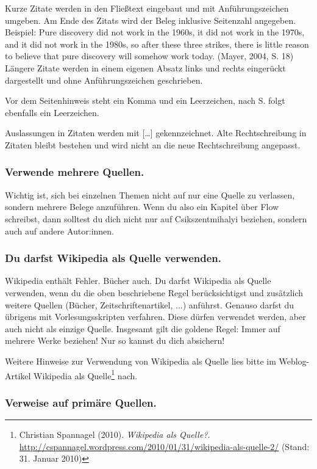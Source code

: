 \documentclass{../cssheet}
\begin{document}
Kurze Zitate werden in den Fließtext eingebaut und mit Anführungszeichen
umgeben. Am Ende des Zitats wird der Beleg inklusive Seitenzahl
angegeben. Beispiel: \glqq{}Pure discovery did not work in the 1960s, it did
not work in the 1970s, and it did not work in the 1980s, so after these
three strikes, there is little reason to believe that pure discovery
will somehow work today.\grqq{} (Mayer, 2004, S. 18) Längere Zitate werden in
einem eigenen Absatz links und rechts eingerückt dargestellt und ohne
Anführungszeichen geschrieben.

Vor dem Seitenhinweis steht ein Komma und ein Leerzeichen, nach \glqq{}S.\grqq{}
folgt ebenfalls ein Leerzeichen.

Auslassungen in Zitaten werden mit [\ldots] gekennzeichnet. Alte
Rechtschreibung in Zitaten bleibt bestehen und wird nicht an die neue
Rechtschreibung angepasst.

\subsubsection*{Verwende mehrere Quellen.}

Wichtig ist, sich bei einzelnen Themen nicht auf nur eine Quelle zu
verlassen, sondern mehrere Belege anzuführen. Wenn du also ein Kapitel
über Flow schreibst, dann solltest du dich nicht nur auf
Csikszentmihalyi beziehen, sondern auch auf andere Autor:innen.

\subsubsection*{Du darfst Wikipedia als Quelle verwenden.}

Wikipedia enthält Fehler. Bücher auch. Du darfst Wikipedia als Quelle
verwenden, wenn du die oben beschriebene Regel berücksichtigst und
zusätzlich weitere Quellen (Bücher, Zeitschriftenartikel, ...) anführst.
Genauso darfst du übrigens mit Vorlesungsskripten verfahren. Diese
dürfen verwendet werden, aber auch nicht als einzige Quelle. Insgesamt
gilt die goldene Regel: Immer auf mehrere Werke beziehen! Nur so kannst
du dich absichern!

Weitere Hinweise zur Verwendung von Wikipedia als Quelle lies bitte im
Weblog-Artikel \glqq{}Wikipedia als Quelle\grqq{}\footnote{Christian Spannagel (2010). \emph{Wikipedia als Quelle?}. \url{http://cspannagel.wordpress.com/2010/01/31/wikipedia-als-quelle-2/} (Stand: 31. Januar 2010)} nach.

\subsubsection*{Verweise auf primäre Quellen.}
\end{document}
